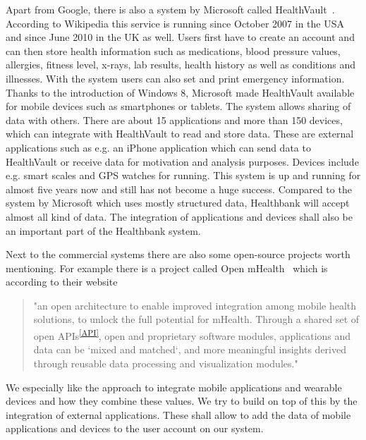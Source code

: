 Apart from Google, there is also a system by Microsoft called HealthVault~\cite{healthvault}. According to Wikipedia this service is running since October 2007 in the USA and since June 2010 in the UK as well. Users first have to create an account and can then store health information such as medications, blood pressure values, allergies, fitness level, x-rays, lab results, health history as well as conditions and illnesses. With the system users can also set and print emergency information. Thanks to the introduction of Windows 8, Microsoft made HealthVault available for mobile devices such as smartphones or tablets. The system allows sharing of data with others. There are about 15 applications and more than 150 devices, which can integrate with HealthVault to read and store data. These are external applications such as e.g. an iPhone application which can send data to HealthVault or receive data for motivation and analysis purposes. Devices include e.g. smart scales and GPS watches for running. This system is up and running for almost five years now and still has not become a huge success. Compared to the system by Microsoft which uses mostly structured data, Healthbank will accept almost all kind of data. The integration of applications and devices shall also be an important part of the Healthbank system.

Next to the commercial systems there are also some open-source projects worth mentioning. For example there is a project called Open mHealth~\cite{openmhealth} which is according to their website
\begin{quote}
"an open architecture to enable improved integration among mobile health solutions, to unlock the full potential for mHealth. Through a shared set of open APIs\textsuperscript{\ref{API}}, open and proprietary software modules, applications and data can be `mixed and matched`, and more meaningful insights derived through reusable data processing and visualization modules."
\end{quote}
We especially like the approach to integrate mobile applications and wearable devices and how they combine these values. We try to build on top of this by the integration of external applications. These shall allow to add the data of mobile applications and devices to the user account on our system.

